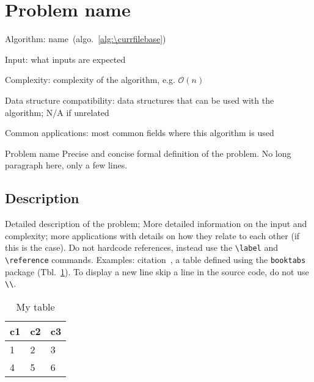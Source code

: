 \documentclass[catalog.tex]{subfiles}
\begin{document}
%
%

\def\pbname{Problem name} %

\section{\pbname} 

\begin{overview}
\item [Algorithm:] name~(algo.~\ref{alg:\currfilebase}) 
\item [Input:] what inputs are expected
\item [Complexity:] complexity of the algorithm, e.g. $\mathcal{O}(n)$
\item [Data structure compatibility:] data structures that can be used with the algorithm; N/A if unrelated
\item [Common applications:] most common fields where this algorithm is used
\end{overview}


\begin{problem}{\pbname}
	Precise and concise formal definition of the problem. No long paragraph here, only a few lines.
\end{problem}


\subsection*{Description}
Detailed description of the problem; More detailed information on the input and complexity; more applications with details on how they relate to each other (if this is the case). Do not hardcode references,  instead use the {\tt \textbackslash label} and {\tt \textbackslash reference} commands.  Examples: citation~\cite{ve477},  a table defined using the {\tt booktabs} package (Tbl.~\ref{tbl:\currfilebase}). To display a new line skip a line in the source code, do not use {\tt \textbackslash\textbackslash}.

\begin{table}[!htb]
	\caption{My table}
	\label{tbl:\currfilebase}
	\centering
	\begin{tabular}{lll}
		\toprule
		c1 & c2 & c3 \\
		\midrule
		1 & 2 & 3 \\
		4 & 5 & 6 \\
		\bottomrule
	\end{tabular}
\end{table}
\end{document}

